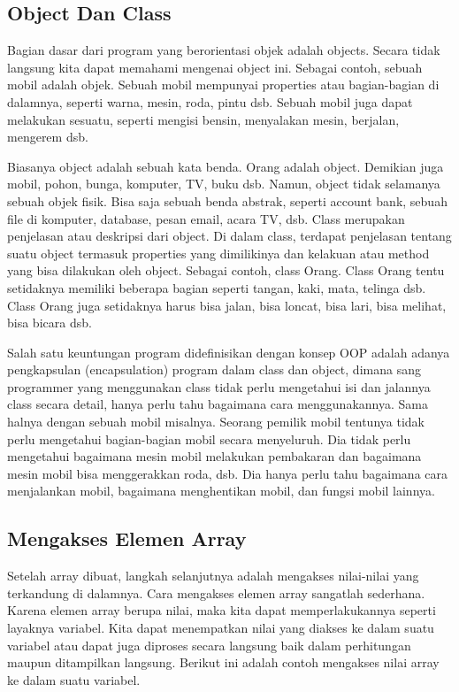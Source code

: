 \subsection{ Object Dan Class}
Bagian dasar dari program yang berorientasi objek adalah objects. Secara tidak langsung  kita dapat memahami mengenai object ini. Sebagai contoh, sebuah mobil adalah objek. Sebuah mobil mempunyai properties atau bagian-bagian di dalamnya, seperti warna, mesin, roda, pintu dsb. Sebuah mobil juga dapat melakukan sesuatu, seperti mengisi bensin, menyalakan mesin, berjalan, mengerem dsb. 
\par
Biasanya object adalah sebuah kata benda. Orang adalah object. Demikian juga mobil, pohon, bunga, komputer, TV, buku dsb. Namun, object tidak selamanya sebuah objek fisik. Bisa saja sebuah benda abstrak, seperti account bank, sebuah file di komputer, database, pesan email, acara TV, dsb. 
Class merupakan penjelasan atau deskripsi dari object. Di dalam class, terdapat penjelasan tentang suatu object termasuk properties yang dimilikinya dan kelakuan atau method yang bisa dilakukan oleh object. Sebagai contoh, class Orang. Class Orang tentu setidaknya memiliki beberapa bagian seperti tangan, kaki, mata, telinga dsb. Class Orang juga setidaknya harus bisa jalan, bisa loncat, bisa lari, bisa melihat, bisa bicara dsb. 
\par
Salah satu keuntungan program didefinisikan dengan konsep OOP adalah adanya pengkapsulan (encapsulation) program dalam class dan object, dimana sang programmer yang menggunakan class tidak perlu mengetahui isi dan jalannya class secara detail, hanya perlu tahu bagaimana cara menggunakannya. Sama halnya dengan sebuah mobil misalnya. Seorang pemilik mobil tentunya tidak perlu mengetahui bagian-bagian mobil secara menyeluruh. Dia tidak perlu mengetahui bagaimana mesin mobil melakukan pembakaran dan bagaimana mesin mobil bisa menggerakkan roda, dsb. Dia hanya perlu tahu bagaimana cara menjalankan mobil, bagaimana menghentikan mobil, dan fungsi mobil lainnya. 


\subsection{Mengakses Elemen Array}
Setelah array dibuat, langkah selanjutnya adalah mengakses nilai-nilai yang terkandung di dalamnya.
Cara mengakses elemen array sangatlah sederhana. Karena elemen array berupa nilai, maka kita dapat
memperlakukannya seperti layaknya variabel.
Kita dapat menempatkan nilai yang diakses ke dalam suatu variabel atau dapat juga diproses secara
langsung baik dalam perhitungan maupun ditampilkan langsung.
Berikut ini adalah contoh mengakses nilai array ke dalam suatu variabel.


